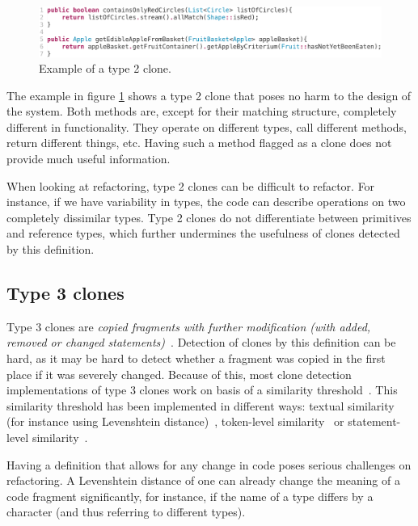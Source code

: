 \begin{figure}[H]
  \includegraphics[width=1\columnwidth]{img/type2}
  \caption{Example of a type 2 clone.}
  \label{fig:type2}
\end{figure}

The example in figure \ref{fig:type2} shows a type 2 clone that poses no harm to the design of the system. Both methods are, except for their matching structure, completely different in functionality. They operate on different types, call different methods, return different things, etc. Having such a method flagged as a clone does not provide much useful information.

When looking at refactoring, type 2 clones can be difficult to refactor. For instance, if we have variability in types, the code can describe operations on two completely dissimilar types. Type 2 clones do not differentiate between primitives and reference types, which further undermines the usefulness of clones detected by this definition.

\subsection{Type 3 clones}\label{sec:type3}
Type 3 clones are \textit{copied fragments with further modification (with added, removed or changed statements)}~\cite{roy2007survey}. Detection of clones by this definition can be hard, as it may be hard to detect whether a fragment was copied in the first place if it was severely changed. Because of this, most clone detection implementations of type 3 clones work on basis of a similarity threshold~\cite{roy2008nicad,ragkhitwetsagul2019siamese,jiang2007deckard,semura2017ccfindersw}. This similarity threshold has been implemented in different ways: textual similarity (for instance using Levenshtein distance)~\cite{lavoie2011automated}, token-level similarity~\cite{sajnani2016sourcerercc} or statement-level similarity~\cite{kamalpriya2017enhancing}.

Having a definition that allows for any change in code poses serious challenges on refactoring. A Levenshtein distance of one can already change the meaning of a code fragment significantly, for instance, if the name of a type differs by a character (and thus referring to different types).

